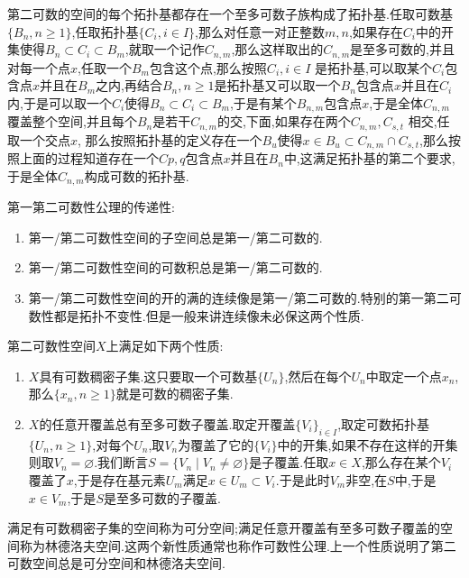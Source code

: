 第二可数的空间的每个拓扑基都存在一个至多可数子族构成了拓扑基.任取可数基$\{B_n,n\ge1\}$,任取拓扑基$\{C_i,i\in I\}$,那么对任意一对正整数$m,n$,如果存在$C_i$中的开集使得$B_n\subset C_i\subset B_m$,就取一个记作$C_{n,m}$,那么这样取出的$C_{n,m}$是至多可数的,并且对每一个点$x$,任取一个$B_m$包含这个点,那么按照$C_i,i\in I$ 是拓扑基,可以取某个$C_i$包含点$x$并且在$B_m$之内,再结合$B_n,n\ge1$是拓扑基又可以取一个$B_n$包含点$x$并且在$C_i$内,于是可以取一个$C_i$使得$B_n\subset C_i\subset B_m$,于是有某个$B_{n,m}$包含点$x$,于是全体$C_{n,m}$覆盖整个空间,并且每个$B_n$是若干$C_{n,m}$的交,下面,如果存在两个$C_{n,m},C_{s,t}$ 相交,任取一个交点$x$, 那么按照拓扑基的定义存在一个$B_u$使得$x\in B_u\subset C_{n,m}\cap C_{s,t}$,那么按照上面的过程知道存在一个$C{p,q}$包含点$x$并且在$B_n$中,这满足拓扑基的第二个要求,于是全体$C_{n,m}$构成可数的拓扑基.

第一第二可数性公理的传递性:
\begin{enumerate}
	\item 第一/第二可数性空间的子空间总是第一/第二可数的.
	\item 第一/第二可数性空间的可数积总是第一/第二可数的.
	\item 第一/第二可数性空间的开的满的连续像是第一/第二可数的.特别的第一第二可数性都是拓扑不变性.但是一般来讲连续像未必保这两个性质.
\end{enumerate}

第二可数性空间$X$上满足如下两个性质:
\begin{enumerate}
	\item $X$具有可数稠密子集.这只要取一个可数基$\{U_n\}$,然后在每个$U_n$中取定一个点$x_n$,那么$\{x_n,n\ge1\}$就是可数的稠密子集.
	\item $X$的任意开覆盖总有至多可数子覆盖.取定开覆盖$\{V_i\}_{i\in I}$,取定可数拓扑基$\{U_n,n\ge1\}$,对每个$U_n$,取$V_n$为覆盖了它的$\{V_i\}$中的开集,如果不存在这样的开集则取$V_n=\varnothing$.我们断言$S=\{V_n\mid V_n\not=\varnothing\}$是子覆盖.任取$x\in X$,那么存在某个$V_i$覆盖了$x$,于是存在基元素$U_m$满足$x\in U_m\subset V_i$.于是此时$V_m$非空,在$S$中,于是$x\in V_m$,于是$S$是至多可数的子覆盖.
\end{enumerate}

满足有可数稠密子集的空间称为可分空间;满足任意开覆盖有至多可数子覆盖的空间称为林德洛夫空间.这两个新性质通常也称作可数性公理.上一个性质说明了第二可数空间总是可分空间和林德洛夫空间.

